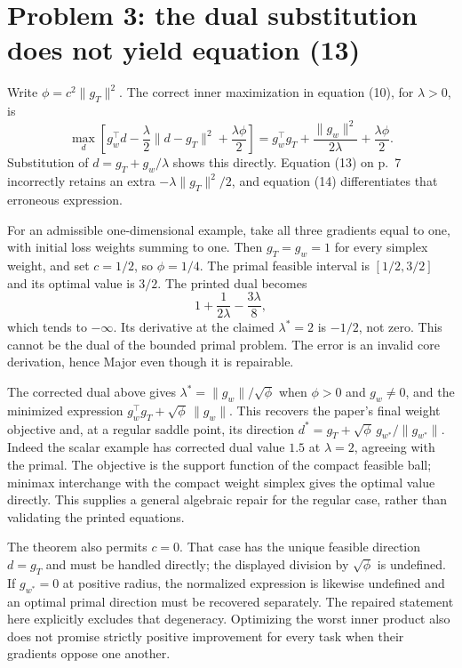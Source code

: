 \documentclass[10pt]{article}
\begin{document}
\section*{Problem 3: the dual substitution does not yield equation (13)}
Write \(\phi=c^2\|g_T\|^2\). The correct inner maximization in equation (10), for \(\lambda>0\), is \[\max_d\left[g_w^\top d-\frac{\lambda}{2}\|d-g_T\|^2+
 \frac{\lambda\phi}{2}\right]
 =g_w^\top g_T+\frac{\|g_w\|^2}{2\lambda}+
 \frac{\lambda\phi}{2}.\] Substitution of \(d=g_T+g_w/\lambda\) shows this directly. Equation (13) on p. 7 incorrectly retains an extra \(-\lambda\|g_T\|^2/2\), and equation (14) differentiates that erroneous expression.\par
For an admissible one-dimensional example, take all three gradients equal to one, with initial loss weights summing to one. Then \(g_T=g_w=1\) for every simplex weight, and set \(c=1/2\), so \(\phi=1/4\). The primal feasible interval is \([1/2,3/2]\) and its optimal value is \(3/2\). The printed dual becomes \[1+\frac{1}{2\lambda}-\frac{3\lambda}{8},\] which tends to \(-\infty\). Its derivative at the claimed \(\lambda^*=2\) is \(-1/2\), not zero. This cannot be the dual of the bounded primal problem. The error is an invalid core derivation, hence Major even though it is repairable.\par
The corrected dual above gives \(\lambda^*=\|g_w\|/\sqrt\phi\) when \(\phi>0\) and \(g_w\ne0\), and the minimized expression \(g_w^\top g_T+\sqrt\phi\,\|g_w\|\). This recovers the paper’s final weight objective and, at a regular saddle point, its direction \(d^*=g_T+\sqrt\phi\,g_{w^*}/\|g_{w^*}\|\). Indeed the scalar example has corrected dual value \(1.5\) at \(\lambda=2\), agreeing with the primal. The objective is the support function of the compact feasible ball; minimax interchange with the compact weight simplex gives the optimal value directly. This supplies a general algebraic repair for the regular case, rather than validating the printed equations.\par
The theorem also permits \(c=0\). That case has the unique feasible direction \(d=g_T\) and must be handled directly; the displayed division by \(\sqrt\phi\) is undefined. If \(g_{w^*}=0\) at positive radius, the normalized expression is likewise undefined and an optimal primal direction must be recovered separately. The repaired statement here explicitly excludes that degeneracy. Optimizing the worst inner product also does not promise strictly positive improvement for every task when their gradients oppose one another.\par
\end{document}
